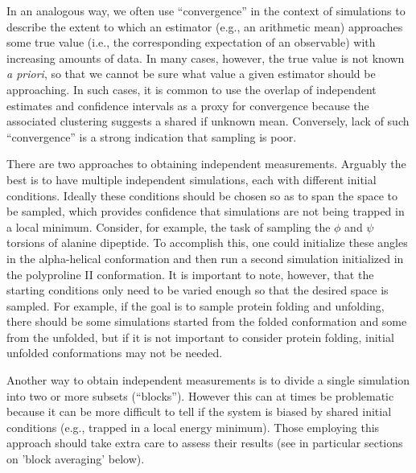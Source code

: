 In an analogous way, we often use ``convergence'' in the context of simulations to describe the extent to which an estimator (e.g., an arithmetic mean) approaches some true value (i.e., the corresponding expectation of an observable) with increasing amounts of data.  In many cases, however, the true value is not known {\it a priori}, so that we cannot be sure what value a given estimator should be approaching.  In such cases, it is common to use the overlap of independent estimates and confidence intervals as a proxy for convergence because the associated clustering suggests a shared if unknown mean.  Conversely, lack of such ``convergence'' is a strong indication that sampling is poor.

 
There are two approaches to obtaining independent measurements. Arguably the best is to have multiple independent simulations, each with different initial conditions. Ideally these conditions should be chosen so as to span the space to be sampled, which provides confidence that simulations are not being trapped in a local minimum. Consider, for example, the task of sampling the $\phi$ and $\psi$ torsions of alanine dipeptide.  To accomplish this, one could initialize these angles in the alpha-helical conformation and then run a second simulation initialized in the polyproline II conformation. It is important to note, however, that the starting conditions only need to be varied enough so that the desired space is sampled. For example, if the goal is to sample protein folding and unfolding, there should be some simulations started from the folded conformation and some from the unfolded, but if it is not important to consider protein folding, initial unfolded conformations may not be needed.
 
Another way to obtain independent measurements is to divide a single simulation into two or more subsets (``blocks''). However this can at times be problematic because it can be more difficult to tell if the system is biased by shared initial conditions (e.g., trapped in a local energy minimum). Those employing this approach should take extra care to assess their results (see in particular sections on 'block averaging' below).


